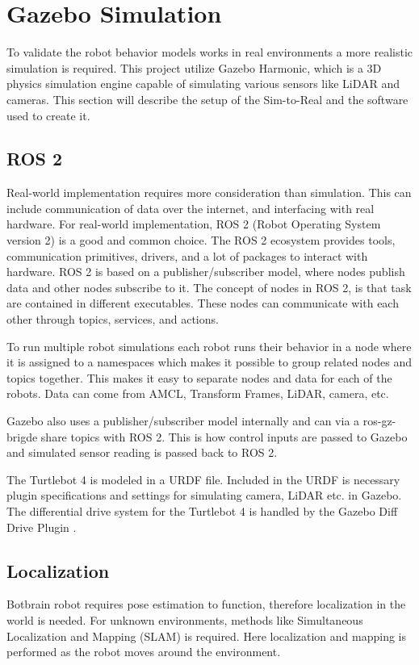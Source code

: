 \section{Gazebo Simulation}
To validate the robot behavior models works in real environments a more realistic simulation is required.
This project utilize Gazebo Harmonic, which is a 3D physics simulation engine capable of simulating various sensors like LiDAR and cameras.
This section will describe the setup of the {\color{red}Sim-to-Real} and the software used to create it.

\subsection{ROS 2}\label{sub:ros_2}
Real-world implementation requires more consideration than simulation. This can include communication of data over the internet, and interfacing with real hardware.
For real-world implementation, ROS 2 (Robot Operating System version 2) is a good and common choice. The ROS 2 ecosystem provides tools, communication primitives, drivers, and a lot of packages to interact with hardware. ROS 2 is based on a publisher/subscriber model, where nodes publish data and other nodes subscribe to it.
The concept of nodes in ROS 2, is that task are contained in different executables. These nodes can communicate with each other through topics, services, and actions.

To run multiple robot simulations each robot runs their behavior in a node where it is assigned to a namespaces which makes it possible to group related nodes and topics together. 
This makes it easy to separate nodes and data for each of the robots. Data can come from AMCL, Transform Frames, LiDAR, camera, etc.

Gazebo also uses a publisher/subscriber model internally and can via a ros-gz-brigde share topics with ROS 2. This is how control inputs are passed to Gazebo and simulated sensor reading is passed back to ROS 2.

The Turtlebot 4 is modeled in a URDF file. Included in the URDF is necessary plugin specifications and settings for simulating camera, LiDAR etc. in Gazebo. The differential drive system for the Turtlebot 4 is handled by the Gazebo Diff Drive Plugin \cite{gz-diff-drive}.

\subsection{Localization}\label{sub:localization} 
Botbrain robot requires pose estimation to function, therefore localization in the world is needed.
For unknown environments, methods like Simultaneous Localization and Mapping (SLAM) is required. Here localization and mapping is performed as the robot moves around the environment.


